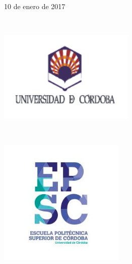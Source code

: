 \documentclass[a4paper, 12pt]{book}
\begin{document}
\begin{titlepage}
\begin{minipage}{0.5\textwidth}
\begin{center}
{\large 10 de enero de 2017}\\[3cm] %

\end{center}
\end{minipage}\\[1cm]


\begin{minipage}{5cm}
\begin{flushleft}
\includegraphics[width=6.5cm]{logo_uco.jpg}
\end{flushleft}
\end{minipage}
~
\begin{minipage}{7cm}
\begin{flushright}
\includegraphics[width=6cm]{EPS.jpg}
\end{flushright}
\end{minipage}\\[3cm]

\afterpage{\null\newpage}
\newpage


 

\vfill 

\end{titlepage}
\end{document}
